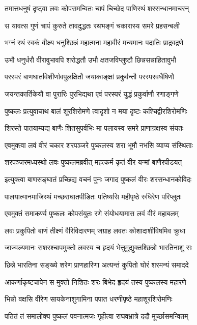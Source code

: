 \twolineshloka
{तमात्तधनुषं दृष्ट्वा लवः कोपसमन्वितः}
{चापं चिच्छेद पाणिस्थं शरसन्धानमाचरन्}%

\twolineshloka
{स यावत्स गुणं चापं कुरुते तावदुद्धतः}
{रथभङ्गं चकारास्य समरे प्रहसन्बली}%

\twolineshloka
{भग्नं रथं स्वकं वीक्ष्य धनुश्छिन्नं महात्मना}
{महावीरं मन्यमानः पदातिः प्राद्रवद्रणे}%

\twolineshloka
{उभौ धनुर्धरौ वीरावुभावपि शरोद्धतौ}
{उभौ क्षतजविप्लुष्टौ छिन्नसन्नाहितावुभौ}%

\twolineshloka
{परस्परं बाणघातविशीर्णावपुलक्षितौ}
{जयाकाङ्क्षां प्रकुर्वन्तौ परस्परवधैषिणौ}%

\twolineshloka
{जयन्तकार्तिकेयौ वा पुरारिः पुरभिद्यथा}
{एवं परस्परं युद्धं प्रकुर्वाणौ रणाङ्गणे}%

\twolineshloka
{पुष्कलः प्रत्युवाचाथ बालं शूरशिरोमणे}
{त्वादृशो न मया दृष्टः कश्चिद्वीरशिरोमणिः}%

\twolineshloka
{शिरस्ते पातयाम्यद्य बाणैः शितसुपर्वभिः}
{मा पलायस्व समरे प्राणान्रक्षस्व संयतः}%

\twolineshloka
{एवमुक्त्वा लवं वीरं चकार शरपञ्जरे}
{पुष्कलस्य शरा भूमौ नभसि व्याप्य संस्थिताः}%

\twolineshloka
{शरपञ्जरमध्यस्थो लवः पुष्कलमब्रवीत्}
{महत्कर्म कृतं वीर यन्मां बाणैरपीडयत्}%

\twolineshloka
{इत्युक्त्वा बाणसङ्घातं प्रच्छिद्य वचनं पुनः}
{जगाद पुष्कलं वीरः शरसन्धानकोविदः}%

\twolineshloka
{पालयात्मानमाजिस्थं मच्छराघातपीडितः}
{पतिष्यसि महीपृष्ठे रुधिरेण परिप्लुतः}%

\twolineshloka
{एवमुक्तं समाकर्ण्य पुष्कलः कोपसंयुतः}
{रणे संयोधयामास लवं वीरं महाबलम्}%

\twolineshloka
{लवः प्रकुपितो बाणं तीक्ष्णं वैरिविदारणम्}
{जग्राह लवतः कोशादाशीविषमिव क्रुधा}%

\twolineshloka
{जाज्वल्यमानः सशरश्चापमुक्तो लवस्य च}
{हृदयं भेत्तुमुद्युक्तश्छिन्नो भारतिनाशु सः}%

\twolineshloka
{छिन्ने भारतिना सङ्ख्ये शरेण प्राणहारिणा}
{अत्यन्तं कुपितो घोरं शरमन्यं समाददे}%

\twolineshloka
{आकर्णाकृष्टचापेन स मुक्तो निशितः शरः}
{बिभेद हृदयं तस्य पुष्कलस्य महारणे}%

\twolineshloka
{भिन्नो वक्षसि वीरेण सायकेनाशुगामिना}
{पपात धरणीपृष्ठे महाशूरशिरोमणिः}%

\twolineshloka
{पतितं तं समालोक्य पुष्कलं पवनात्मजः}
{गृहीत्वा राघवभ्रात्रे ददौ मूर्च्छासमन्वितम्}%


